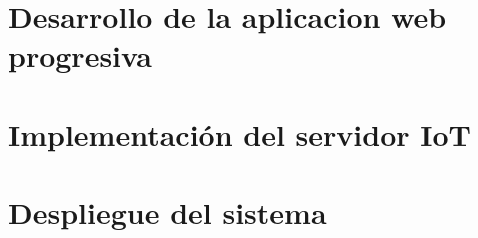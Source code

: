 \section{Desarrollo de la aplicacion web progresiva}

\section{Implementación del servidor IoT}

\section{Despliegue del sistema}



